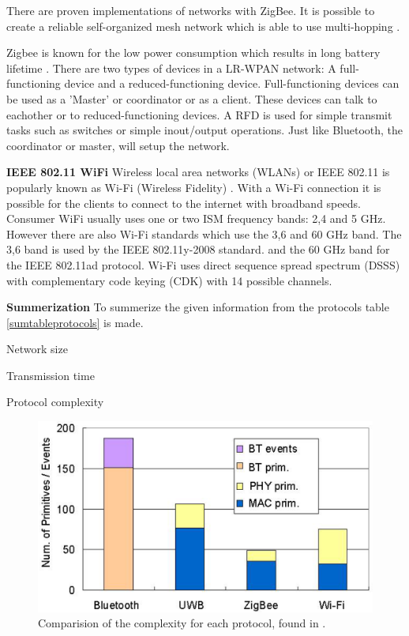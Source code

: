 \documentclass[10pt,a4paper]{article}
\begin{document}
There are proven implementations of networks with ZigBee. It is possible to create a reliable self-organized mesh network which is able to use multi-hopping \cite{comparitivestudywirelessprotocols}.

Zigbee is known for the low power consumption which results in long battery lifetime \cite{performanceevaluationlowratewirelesspan}. There are two types of devices in a LR-WPAN network: A full-functioning device and a reduced-functioning device. Full-functioning devices can be used as a 'Master' or coordinator or as a client. These devices can talk to eachother or to reduced-functioning devices. A RFD is used for simple transmit tasks such as switches or simple inout/output operations. Just like Bluetooth, the coordinator or master, will setup the network.

\textbf{IEEE 802.11 WiFi}
Wireless local area networks (WLANs) or IEEE 802.11 is popularly known as Wi-Fi (Wireless Fidelity) \cite{wirelessmeshnetworksopportunitiesandchallenges}. With a Wi-Fi connection it is possible for the clients to connect to the internet with broadband speeds. Consumer WiFi usually uses one or two ISM frequency bands: 2,4 and 5 GHz. However there are also Wi-Fi standards which use the 3,6 and 60 GHz band. The 3,6 band is used by the IEEE 802.11y-2008 standard. and the 60 GHz band for the IEEE 802.11ad protocol. Wi-Fi uses direct sequence spread spectrum (DSSS) with complementary code keying (CDK) with 14 possible channels.

\textbf{Summerization}
To summerize the given information from the protocols table \ref{sumtableprotocols} is made.

Network size

Transmission time

Protocol complexity
\begin{figure}[H]
   \centering
   \includegraphics[width=1\textwidth]{protocolcomplexity}
   \caption{Comparision of the complexity for each protocol, found in \cite{comparitivestudywirelessprotocols}.}
   \label{fig:protocolcomplexity}
\end{figure}
\end{document}
